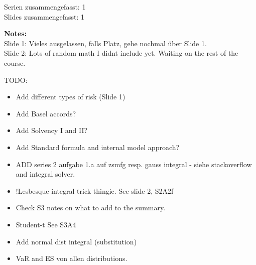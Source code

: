 \documentclass[12pt]{article}
\begin{document}
\maketitle

Serien zusammengefasst: 1 \\
Slides zusammengefasst: 1 

\textbf{Notes:} \\
Slide 1: Vieles ausgelassen, falls Platz, gehe nochmal über
Slide 1. \\
Slide 2: Lots of random math I didnt include yet. Waiting on the rest of the
course.


TODO:
\begin{itemize}
  \item Add different types of risk (Slide 1)
  \item Add Basel accords?
  \item Add Solvency I and II?
  \item Add Standard formula and internal model approach?
  \item ADD series 2 aufgabe 1.a auf zsmfg resp. gauss integral - siehe
        stackoverflow and integral solver.
  \item !Lesbesque integral trick thingie. See slide 2, S2A2f
  \item Check S3 notes on what to add to the summary.
  \item Student-t See S3A4
  \item Add normal dist integral (substitution)
  \item VaR and ES von allen distributions.
\end{itemize}
\end{document}
